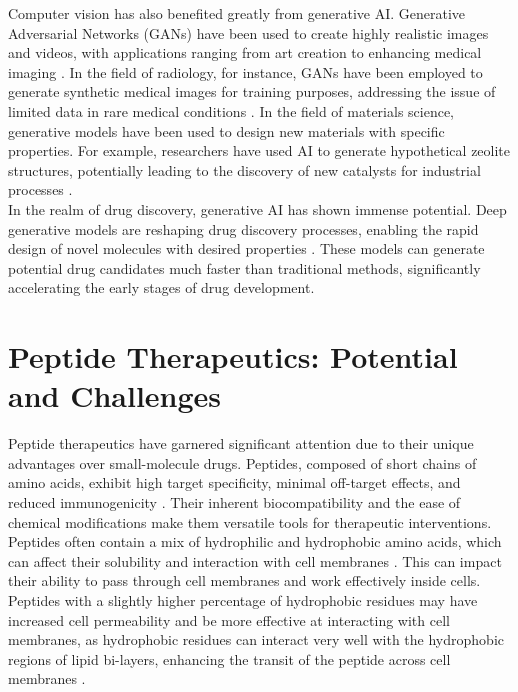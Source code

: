 Computer vision has also benefited greatly from generative AI. Generative Adversarial Networks (GANs) have been used to create highly realistic images and videos, with applications ranging from art creation to enhancing medical imaging \cite{pinaya2023monai}. In the field of radiology, for instance, GANs have been employed to generate synthetic medical images for training purposes, addressing the issue of limited data in rare medical conditions \cite{chen2021synmed}. In the field of materials science, generative models have been used to design new materials with specific properties. For example, researchers have used AI to generate hypothetical zeolite structures, potentially leading to the discovery of new catalysts for industrial processes \cite{mok2024catalyst}. \\

In the realm of drug discovery, generative AI has shown immense potential. Deep generative models are reshaping drug discovery processes, enabling the rapid design of novel molecules with desired properties \cite{deng2022artificial}. These models can generate potential drug candidates much faster than traditional methods, significantly accelerating the early stages of drug development.

\section{Peptide Therapeutics: Potential and Challenges} 
Peptide therapeutics have garnered significant attention due to their unique advantages over
small-molecule drugs. Peptides, composed of short chains of amino acids, exhibit high target
specificity, minimal off-target effects, and reduced immunogenicity \cite{wang2022therapeutic}.
Their inherent biocompatibility and the ease of chemical modifications make them versatile tools for
therapeutic interventions. Peptides often contain a mix of hydrophilic and hydrophobic amino acids,
which can affect their solubility and interaction with cell membranes \cite{madani2011mech}. This
can impact their ability to pass through cell membranes and work effectively inside cells. Peptides
with a slightly higher percentage of hydrophobic residues may have increased cell permeability
\cite{madani2011mech} and be more effective at interacting with cell membranes, as hydrophobic
residues can interact very well with the hydrophobic regions of lipid bi-layers, enhancing the
transit of the peptide across cell membranes \cite{madani2011mech}. \\

